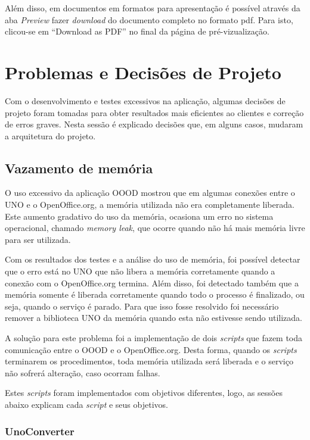 Além disso, em documentos em formatos para apresentação é possível através da aba \textit{Preview} fazer \textit{download} do documento completo no formato pdf. Para isto, clicou-se em ``Download as PDF'' no final da página de pré-vizualização.

\section{Problemas e Decisões de Projeto}

Com o desenvolvimento e testes excessivos na aplicação, algumas decisões de projeto foram tomadas para obter resultados mais eficientes ao clientes e correção de erros graves. Nesta sessão é explicado decisões que, em alguns casos, mudaram a arquitetura do projeto.

\subsection{Vazamento de memória}

O uso excessivo da aplicação OOOD mostrou que em algumas conexões entre o UNO e o OpenOffice.org, a memória utilizada não era completamente liberada. Este aumento gradativo do uso da memória, ocasiona um erro no sistema operacional, chamado \textit{memory leak}, que ocorre quando não há mais memória livre para ser utilizada. 

Com os resultados dos testes e a análise do uso de memória, foi possível detectar que o erro está no UNO que não libera a memória corretamente quando a conexão com o OpenOffice.org termina. Além disso, foi detectado também que a memória somente é liberada corretamente quando todo o processo é finalizado, ou seja, quando o serviço é parado. Para que isso fosse resolvido foi necessário remover a biblioteca UNO da memória quando esta não estivesse sendo utilizada.

A solução para este problema foi a implementação de dois \textit{scripts} que fazem toda comunicação entre o OOOD e o OpenOffice.org. Desta forma, quando os \textit{scripts} terminarem os procedimentos, toda memória utilizada será liberada e o serviço não sofrerá alteração, caso ocorram falhas.

Estes \textit{scripts} foram implementados com objetivos diferentes, logo, as sessões abaixo explicam cada \textit{script} e seus objetivos.

\subsubsection{UnoConverter}

